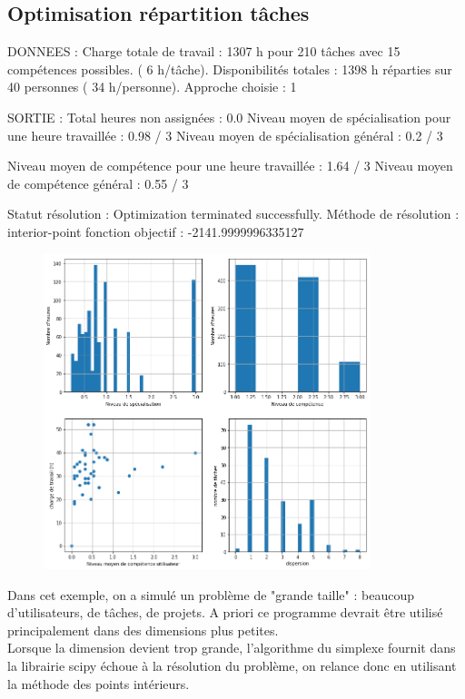 \documentclass[12pt]{article}
\newenvironment{code}%
   {\snugshade\verbatim}%
   {\endverbatim\endsnugshade}
\begin{document}
\subsection{Optimisation répartition tâches}
\hypertarget{Ref10}{}
\begin{code}
DONNEES :
Charge totale de travail   : 1307 h pour 210 tâches avec 15 compétences possibles. 
							 ( 6 h/tâche).
Disponibilités totales     : 1398 h réparties sur 40 personnes 
							 ( 34 h/personne).
Approche choisie : 1

SORTIE :
Total heures non assignées : 0.0
Niveau moyen de spécialisation pour une heure travaillée : 0.98 / 3
Niveau moyen de spécialisation général : 0.2 / 3

Niveau moyen de compétence pour une heure travaillée     : 1.64 / 3
Niveau moyen de compétence général : 0.55 / 3

Statut résolution : Optimization terminated successfully.
Méthode de résolution      : interior-point
fonction objectif          : -2141.9999996335127
\end{code}
\begin{figure}[H]
\begin{center}
\includegraphics[width=0.85\textwidth]{SADT1}
\end{center}
\end{figure}



Dans cet exemple, on a simulé un problème de "grande taille" : beaucoup d'utilisateurs, de tâches, de projets. A priori ce programme devrait être utilisé principalement dans des dimensions plus petites.\\
Lorsque la dimension devient trop grande, l'algorithme du simplexe fournit dans la librairie scipy échoue à la résolution du problème, on relance donc en utilisant la méthode des points intérieurs.
\end{document}
